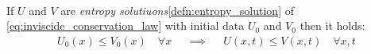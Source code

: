 \begin{propertybox}\nospacing
    \begin{property}\label{property:monotoniciy_preserving_conservation_laws}\leavevmode\\
        If $U$ and $V$ are \textit{entropy solutiuons}\cref{defn:entropy_solution} of \cref{eq:inviscide_conservation_law} with initial data $U_{0}$ and $V_{0}$
        then it holds:
        \begin{align}
          U_{0}(x)\leq V_{0}(x)\quad\forall x&&\implies&& U(x,t)\leq V(x,t)\quad\forall x,t
        \end{align}
    \end{property}
\end{propertybox}

